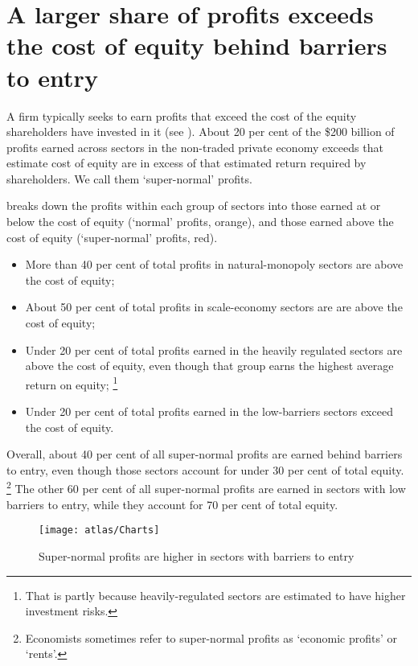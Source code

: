 \newpage

\section{A larger share of profits exceeds the cost of equity behind barriers to entry}

A firm typically seeks to earn profits that exceed the cost of the equity shareholders have invested in it (see ). 
About 20 per cent of the \$200 billion of profits earned across sectors in the non-traded private economy exceeds that estimate cost of equity are in excess of that estimated return required by shareholders. We call them `super-normal' profits. 

 breaks down the profits within each group of sectors into those earned at or below the cost of equity (`normal' profits, orange), and those earned above the cost of equity (`super-normal' profits, red). 
\begin{itemize}
    \item More than 40 per cent of total profits in natural-monopoly sectors are above the cost of equity;
    \item About 50 per cent of total profits in scale-economy sectors are are above the cost of equity;
    \item Under 20 per cent of total profits earned in the heavily regulated sectors are above the cost of equity, even though that group earns the highest average return on equity;%
    \footnote{That is partly because heavily-regulated sectors are estimated to have higher investment risks.}
    \item Under 20 per cent of total profits earned in the low-barriers sectors exceed the cost of equity. 
\end{itemize}

Overall, about 40 per cent of all super-normal profits are earned behind barriers to entry, even though those sectors account for under 30 per cent of total equity.%
    \footnote{Economists sometimes refer to super-normal profits as `economic profits' or `rents'.}
The other 60 per cent of all super-normal profits are earned in sectors with low barriers to entry, while they account for 70 per cent of total equity. 

\begin{figure}
    \caption{Super-normal profits are higher in sectors with barriers to entry \label{fig:SNP-pc-of-profit}}
  \texttt{[image: atlas/Charts]} 
\end{figure}

